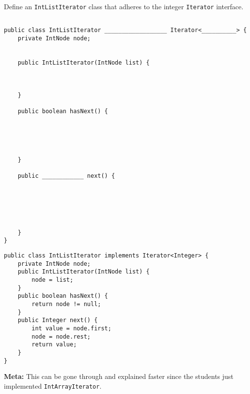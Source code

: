 \question Define an \lstinline$IntListIterator$ class that adheres to the integer
\lstinline$Iterator$ interface.
\ifprintanswers\else
\begin{lstlisting}

public class IntListIterator __________________ Iterator<__________> {
    private IntNode node;


    public IntListIterator(IntNode list) {



    }
    
    public boolean hasNext() {





    }
    
    public ____________ next() {
    
    
    
    
    
    
    }
}
\end{lstlisting}
\fi

\begin{solution}
\begin{lstlisting}
public class IntListIterator implements Iterator<Integer> {
    private IntNode node;
    public IntListIterator(IntNode list) {
        node = list;
    }
    public boolean hasNext() {
        return node != null;
    }
    public Integer next() {
        int value = node.first;
        node = node.rest;
        return value;
    }
}
\end{lstlisting}

\begin{meta}

\textbf{Meta:} This can be gone through and explained faster since the students
just implemented \lstinline$IntArrayIterator$.

\end{meta}

\end{solution}

